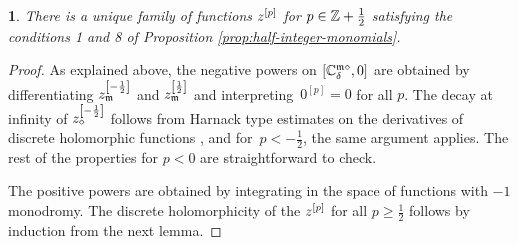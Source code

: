 \documentclass[12pt,oneside,english]{amsart}
\numberwithin{equation}{section}
\numberwithin{figure}{section}
\theoremstyle{plain}
\theoremstyle{plain}
\theoremstyle{plain}
\theoremstyle{plain}
\newtheorem{lem}[thm]{\protect\lemmaname}
\theoremstyle{remark}
\theoremstyle{definition}
\theoremstyle{plain}
\theoremstyle{plain}
\numberwithin{thm}{section}
\newcommand{\kallemod}[1]{{\color{kallecol} {#1}}}
\providecommand{\lemmaname}{Lemma}
\providecommand{\lemmaname}{Lemma}
\providecommand{\lemmaname}{Lemma}
\providecommand{\lemmaname}{Lemma}
\begin{document}
\begin{lem}
\label{lem:half-int-mon}There is a unique family of functions 
${z^{[{p}]}} $
for $p\in\mathbb{Z} +\frac{1}{2}$ satisfying the conditions 1
and 8 of Proposition \ref{prop:half-integer-monomials}. 
\end{lem}
\begin{proof}
As explained above, the negative powers on 
${\left[ {\mathbb{C}_{{\delta}}^{\mathfrak{m}\diamond}}, 0 \right]}$
are obtained by differentiating $z_{\mathfrak{m}}^{\left[-\frac{1}{2}\right]}$
and $z_{\mathfrak{m}}^{\left[\frac{1}{2}\right]}$ and interpreting~$0^{[p]}=0$
for all $p$. The decay at infinity of $z_{\diamond}^{\left[-\frac{1}{2}\right]}$
follows from Harnack type estimates on the derivatives of discrete holomorphic
functions \cite{lawler-limic}, and for~$p<-\frac{1}{2}$, the 
same argument applies. The
rest of the properties for $p<0$ are straightforward to check.

The positive powers are obtained by integrating in the space of functions
with $-1$ monodromy. The discrete holomorphicity of the ${z^{[{p}]}} $
for all $p\geq\frac{1}{2}$ follows by induction from the next lemma. 
\end{proof}
\end{document}
